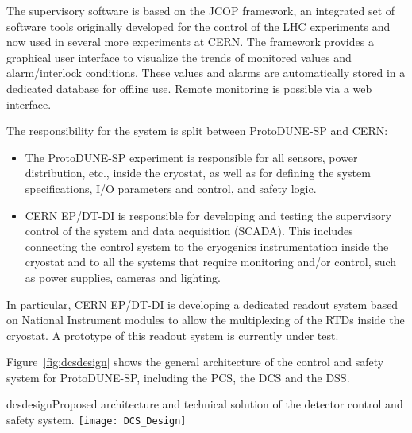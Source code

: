 The supervisory software is based on the JCOP framework, an integrated set of software tools originally developed for the control of the LHC experiments and 
now used in several more experiments at CERN. The framework provides a graphical user interface to visualize the trends of monitored values and 
alarm/interlock conditions. These values and alarms are automatically stored in a dedicated database for offline use. Remote monitoring is possible via a web 
interface.

The responsibility for the system is split between ProtoDUNE-SP and CERN: 
\begin{itemize}
\item The ProtoDUNE-SP experiment is responsible for all sensors, power distribution, etc., inside the cryostat, 
as well as for defining the system specifications, I/O parameters and control, and safety logic. 
\item CERN EP/DT-DI  is responsible for developing and testing the supervisory control of the system and data acquisition (SCADA).
This includes connecting the control system to the cryogenics instrumentation inside the cryostat and to all the systems that require monitoring and/or control, such as power supplies, cameras and lighting. 
\end{itemize}

In particular, CERN EP/DT-DI is developing a dedicated readout system based on National Instrument modules to allow the 
multiplexing of the RTDs inside the cryostat.  A prototype of this readout system is currently under test.
 
Figure~\ref{fig:dcsdesign} shows the general architecture of the control and safety system for ProtoDUNE-SP, including the PCS, the DCS and the DSS.

\begin{cdrfigure}{dcsdesign}{Proposed architecture and technical solution of the detector control and safety system.}
\texttt{[image: DCS\_Design]}
\end{cdrfigure}

